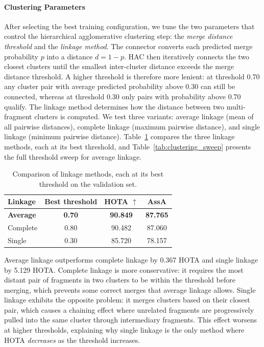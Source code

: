 \paragraph{Clustering Parameters}\label{par:clustering_parameters}

After selecting the best training configuration, we tune the two parameters that control the hierarchical agglomerative clustering step: the \emph{merge distance threshold} and the \emph{linkage method}. The connector converts each predicted merge probability $p$ into a distance $d = 1 - p$. HAC then iteratively connects the two closest clusters until the smallest inter-cluster distance exceeds the merge distance threshold. A higher threshold is therefore more lenient: at threshold 0.70 any cluster pair with average predicted probability above 0.30 can still be connected, whereas at threshold 0.30 only pairs with probability above 0.70 qualify. The linkage method determines how the distance between two multi-fragment clusters is computed. We test three variants: average linkage (mean of all pairwise distances), complete linkage (maximum pairwise distance), and single linkage (minimum pairwise distance). Table~\ref{tab:linkage_comparison} compares the three linkage methods, each at its best threshold, and Table~\ref{tab:clustering_sweep} presents the full threshold sweep for average linkage.

\begin{table}[H]
\centering
\begin{tabular}{lccc}
\toprule
\textbf{Linkage} & \textbf{Best threshold} & \textbf{HOTA $\uparrow$} & \textbf{AssA} \\
\midrule
\textbf{Average} & \textbf{0.70} & \textbf{90.849} & \textbf{87.765} \\
Complete & 0.80 & 90.482 & 87.060 \\
Single & 0.30 & 85.720 & 78.157 \\
\bottomrule
\end{tabular}
\caption{Comparison of linkage methods, each at its best threshold on the validation set.}
\label{tab:linkage_comparison}
\end{table}

Average linkage outperforms complete linkage by 0.367 HOTA and single linkage by 5.129 HOTA. Complete linkage is more conservative: it requires the most distant pair of fragments in two clusters to be within the threshold before merging, which prevents some correct merges that average linkage allows. Single linkage exhibits the opposite problem: it merges clusters based on their closest pair, which causes a chaining effect where unrelated fragments are progressively pulled into the same cluster through intermediary fragments. This effect worsens at higher thresholds, explaining why single linkage is the only method where HOTA \emph{decreases} as the threshold increases.

